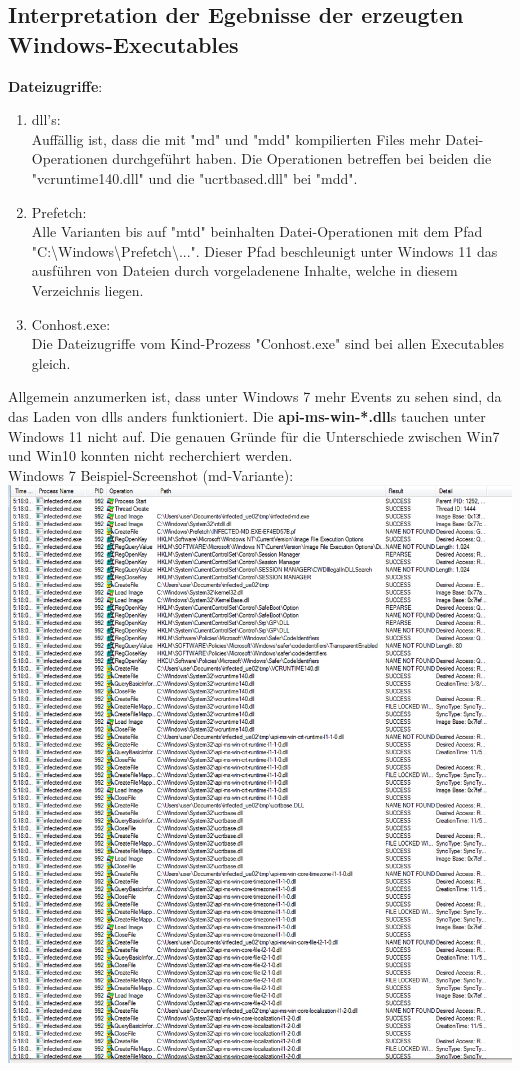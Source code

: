 \documentclass{article}
\begin{document}
	\subsection*{Interpretation der Egebnisse der erzeugten Windows-Executables}
	\textbf{Dateizugriffe}:\\
	\begin{enumerate}
		\item dll's:\\
		Auffällig ist, dass die mit "md" und "mdd" kompilierten Files mehr Datei-Operationen durchgeführt haben. Die Operationen betreffen bei beiden die "vcruntime140.dll" und die "ucrtbased.dll" bei "mdd".
		\item Prefetch:\\
		Alle Varianten bis auf "mtd" beinhalten Datei-Operationen mit dem Pfad "C:\textbackslash Windows\textbackslash Prefetch\textbackslash ...". Dieser Pfad beschleunigt unter Windows 11 das ausführen von Dateien durch vorgeladenene Inhalte, welche in diesem Verzeichnis liegen.
		\item Conhost.exe:\\
		Die Dateizugriffe vom Kind-Prozess "Conhost.exe" sind bei allen Executables gleich.
	\end{enumerate}
	Allgemein anzumerken ist, dass unter Windows 7 mehr Events zu sehen sind, da das Laden von dlls anders funktioniert. Die \textbf{api-ms-win-*.dll}s tauchen unter Windows 11 nicht auf. Die genauen Gründe für die Unterschiede zwischen Win7 und Win10 konnten nicht recherchiert werden.\\
	Windows 7 Beispiel-Screenshot (md-Variante):\\
	\includegraphics[width=0.7\linewidth]{"pictures/1.7 event class file2"}\\
	
\end{document}
